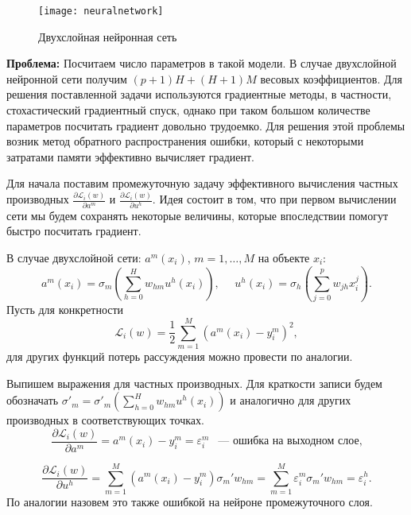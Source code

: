\documentclass{article}
\begin{document}
	\begin{figure}[H]
		\begin{center}
			\begin{minipage}{0.85\linewidth}
				\texttt{[image: neuralnetwork]}
				\caption{Двухслойная нейронная сеть}
				\label{neuralnetwork}
			\end{minipage}
		\end{center}
	\end{figure}
	
	\textbf{Проблема:} Посчитаем число параметров в такой модели. В случае двухслойной нейронной сети получим $(p+1)H+(H+1)M$ весовых коэффициентов. Для решения поставленной задачи используются градиентные методы, в частности, стохастический градиентный спуск, однако при таком большом количестве параметров посчитать градиент довольно трудоемко. Для решения этой проблемы возник метод обратного распространения ошибки, который с некоторыми затратами памяти эффективно вычисляет градиент.
	
	Для начала поставим промежуточную задачу эффективного вычисления частных производных $\frac{\partial \mathcal{L}_i(w)}{\partial a^m}$ и $\frac{\partial \mathcal{L}_i(w)}{\partial u^h}$. Идея состоит в том, что при первом вычислении сети мы будем сохранять некоторые величины, которые впоследствии помогут быстро посчитать градиент.
	
	В случае двухслойной сети: $a^m(x_i)$, $m=1,\ldots,M$ на объекте $x_i$:
	\begin{equation*}
		a^m(x_i) = \sigma_m \left(\sum_{h=0}^{H} w_{hm}  u^h(x_i)  \right), ~~~~~~
		u^h(x_i) = \sigma_h \left(\sum_{j=0}^{p} w_{jh} x_{i}^j   \right).
	\end{equation*}
	Пусть для конкретности
	\begin{equation*}
		\mathcal{L}_i(w) = \frac{1}{2} \sum_{m=1}^{M}(a^m(x_i) - y^m_i)^2,
	\end{equation*}
	для других функций потерь рассуждения можно провести по аналогии.
	
	Выпишем выражения для частных производных. Для краткости записи будем обозначать $\sigma'_m = \sigma'_m (\sum\limits_{h=0}^H w_{hm} u^h(x_i))$ и аналогично для других производных в соответствующих точках.
	\begin{equation*}
		\frac{\partial \mathcal{L}_i(w)}{\partial a^m} = a^m(x_i) - y_i^m = \varepsilon^m_i ~~\text{ --- ошибка на выходном слое,}
	\end{equation*}
	
	\begin{equation*}
		\frac{\partial \mathcal{L}_i(w)}{\partial u^h} = \sum \limits_{m=1}^M (a^m(x_i) - y_i^m) \sigma_m' w_{hm} = \sum \limits_{m=1}^M \varepsilon^m_i \sigma_m' w_{hm} = \varepsilon^h_i.
	\end{equation*}
	По аналогии назовем это также ошибкой на нейроне промежуточного слоя.
	
\end{document}
